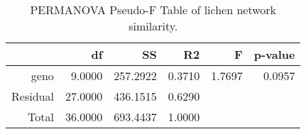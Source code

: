 \begin{table}[ht]
\centering
\begin{tabular}{rrrrrr}
  \hline
 & df & SS & R2 & F & p-value \\ 
  \hline
geno & 9.0000 & 257.2922 & 0.3710 & 1.7697 & 0.0957 \\ 
  Residual & 27.0000 & 436.1515 & 0.6290 &  &  \\ 
  Total & 36.0000 & 693.4437 & 1.0000 &  &  \\ 
   \hline
\end{tabular}
\caption{PERMANOVA Pseudo-F Table of lichen network similarity.} 
\label{tab:cn_perm}
\end{table}
